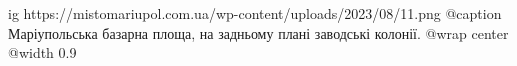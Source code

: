  
 
 
 
 

\ifcmt
  ig https://mistomariupol.com.ua/wp-content/uploads/2023/08/11.png
	@caption Маріупольська базарна площа, на задньому плані заводські колонії.
  @wrap center
  @width 0.9
\fi
